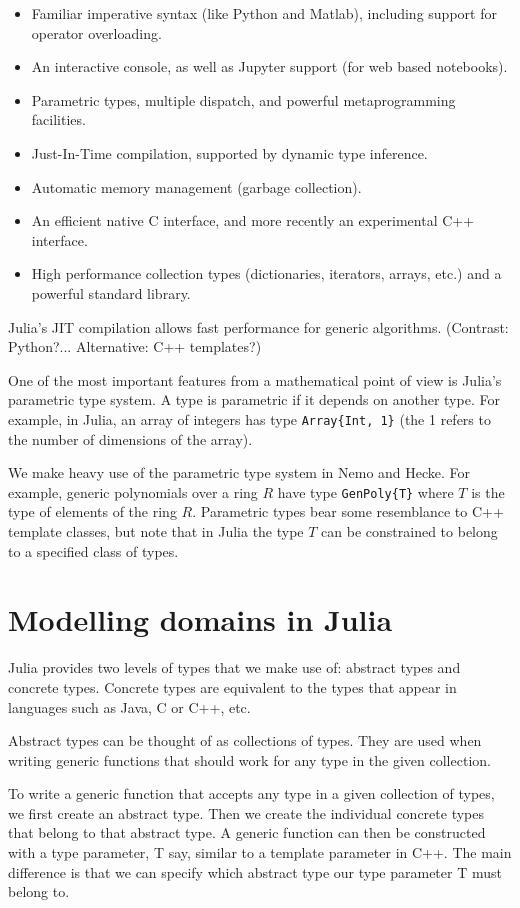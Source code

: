 \documentclass{sig-alternate-05-2015}
\begin{document}
\begin{itemize}
\item Familiar imperative syntax (like Python and Matlab), including support for operator overloading.
\item An interactive console, as well as Jupyter support (for web based notebooks).
\item Parametric types, multiple dispatch, and powerful metaprogramming facilities.
\item Just-In-Time compilation, supported by dynamic type inference.
\item Automatic memory management (garbage collection).
\item An efficient native C interface, and more recently an experimental C++ interface.
\item High performance collection types (dictionaries, iterators, arrays, etc.) and a powerful standard library.
\end{itemize}

Julia's JIT compilation allows fast performance for
generic algorithms. (Contrast: Python?... Alternative: C++ templates?)

One of the most important features from a mathematical point of view is Julia's parametric type system.
A type is parametric if it depends on another type. For example, in Julia, an array of integers has
type \texttt{Array\{Int, 1\}} (the 1 refers to the number of dimensions of the array).

We make heavy use of the parametric type system in Nemo and Hecke. For example, generic polynomials
over a ring $R$ have type \texttt{GenPoly\{T\}} where $T$ is the type of elements of the ring $R$.
Parametric types bear some resemblance to C++ template classes, but note that in Julia the type $T$ can
be constrained to belong to a specified class of types.

\section{Modelling domains in Julia}

Julia provides two levels of types that we make use of: abstract types and concrete types.
Concrete types are equivalent to the types that appear in languages such as Java, C or C++,
etc.

Abstract types can be thought of as collections of types. They are used when writing generic
functions that should work for any type in the given collection.

To write a generic function that accepts any type in a given collection of types, we first
create an abstract type. Then we create the individual concrete types that belong to that
abstract type. A generic function can then be constructed with a type parameter, T
say, similar to a template parameter in C++. The main difference is that we can specify
which abstract type our type parameter T must belong to.
\end{document}
